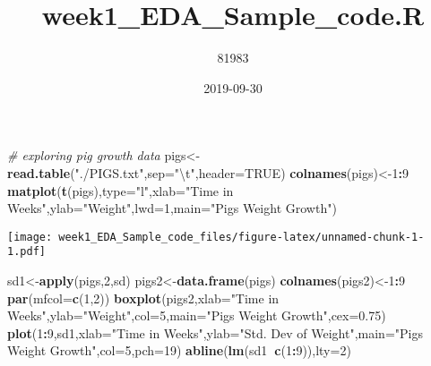 \documentclass[]{article}
\title{week1\_EDA\_Sample\_code.R}
\author{81983}
\date{2019-09-30}
\newenvironment{Shaded}{\begin{snugshade}}{\end{snugshade}}
\newcommand{\CharTok}[1]{\textcolor[rgb]{0.31,0.60,0.02}{#1}}
\newcommand{\CommentTok}[1]{\textcolor[rgb]{0.56,0.35,0.01}{\textit{#1}}}
\newcommand{\DataTypeTok}[1]{\textcolor[rgb]{0.13,0.29,0.53}{#1}}
\newcommand{\DecValTok}[1]{\textcolor[rgb]{0.00,0.00,0.81}{#1}}
\newcommand{\FloatTok}[1]{\textcolor[rgb]{0.00,0.00,0.81}{#1}}
\newcommand{\KeywordTok}[1]{\textcolor[rgb]{0.13,0.29,0.53}{\textbf{#1}}}
\newcommand{\NormalTok}[1]{#1}
\newcommand{\OperatorTok}[1]{\textcolor[rgb]{0.81,0.36,0.00}{\textbf{#1}}}
\newcommand{\OtherTok}[1]{\textcolor[rgb]{0.56,0.35,0.01}{#1}}
\newcommand{\StringTok}[1]{\textcolor[rgb]{0.31,0.60,0.02}{#1}}
\begin{document}
\maketitle

\begin{Shaded}
\begin{Highlighting}[]
\CommentTok{# exploring pig growth data}
\NormalTok{pigs<-}\KeywordTok{read.table}\NormalTok{(}\StringTok{"./PIGS.txt"}\NormalTok{,}\DataTypeTok{sep=}\StringTok{"}\CharTok{\textbackslash{}t}\StringTok{"}\NormalTok{,}\DataTypeTok{header=}\OtherTok{TRUE}\NormalTok{)}
\KeywordTok{colnames}\NormalTok{(pigs)<-}\DecValTok{1}\OperatorTok{:}\DecValTok{9}
\KeywordTok{matplot}\NormalTok{(}\KeywordTok{t}\NormalTok{(pigs),}\DataTypeTok{type=}\StringTok{"l"}\NormalTok{,}\DataTypeTok{xlab=}\StringTok{"Time in Weeks"}\NormalTok{,}\DataTypeTok{ylab=}\StringTok{"Weight"}\NormalTok{,}\DataTypeTok{lwd=}\DecValTok{1}\NormalTok{,}\DataTypeTok{main=}\StringTok{"Pigs Weight Growth"}\NormalTok{)}
\end{Highlighting}
\end{Shaded}

\texttt{[image: week1\_EDA\_Sample\_code\_files/figure-latex/unnamed-chunk-1-1.pdf]}

\begin{Shaded}
\begin{Highlighting}[]
\NormalTok{sd1<-}\KeywordTok{apply}\NormalTok{(pigs,}\DecValTok{2}\NormalTok{,sd)}
\NormalTok{pigs2<-}\KeywordTok{data.frame}\NormalTok{(pigs)}
\KeywordTok{colnames}\NormalTok{(pigs2)<-}\DecValTok{1}\OperatorTok{:}\DecValTok{9}
\KeywordTok{par}\NormalTok{(}\DataTypeTok{mfcol=}\KeywordTok{c}\NormalTok{(}\DecValTok{1}\NormalTok{,}\DecValTok{2}\NormalTok{))}
\KeywordTok{boxplot}\NormalTok{(pigs2,}\DataTypeTok{xlab=}\StringTok{"Time in Weeks"}\NormalTok{,}\DataTypeTok{ylab=}\StringTok{"Weight"}\NormalTok{,}\DataTypeTok{col=}\DecValTok{5}\NormalTok{,}\DataTypeTok{main=}\StringTok{"Pigs Weight Growth"}\NormalTok{,}\DataTypeTok{cex=}\FloatTok{0.75}\NormalTok{)}
\KeywordTok{plot}\NormalTok{(}\DecValTok{1}\OperatorTok{:}\DecValTok{9}\NormalTok{,sd1,}\DataTypeTok{xlab=}\StringTok{"Time in Weeks"}\NormalTok{,}\DataTypeTok{ylab=}\StringTok{"Std. Dev of Weight"}\NormalTok{,}\DataTypeTok{main=}\StringTok{"Pigs Weight Growth"}\NormalTok{,}\DataTypeTok{col=}\DecValTok{5}\NormalTok{,}\DataTypeTok{pch=}\DecValTok{19}\NormalTok{)}
\KeywordTok{abline}\NormalTok{(}\KeywordTok{lm}\NormalTok{(sd1}\OperatorTok{~}\KeywordTok{c}\NormalTok{(}\DecValTok{1}\OperatorTok{:}\DecValTok{9}\NormalTok{)),}\DataTypeTok{lty=}\DecValTok{2}\NormalTok{)}
\end{Highlighting}
\end{Shaded}
\end{document}
